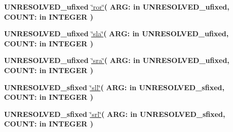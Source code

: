 \begin{DoxyCompactItemize}
\item 
{\bfseries {\bfseries \textcolor{vhdlchar}{U\+N\+R\+E\+S\+O\+L\+V\+E\+D\+\_\+ufixed}\textcolor{vhdlchar}{ }}} \hyperlink{class__fixed__pkg_a9c6bda0792f388964062276c995926d6}{\char`\"{}ror\char`\"{}}{\bfseries  ( }{\bfseries \textcolor{vhdlchar}{A\+R\+G\+: }\textcolor{stringliteral}{in }\textcolor{vhdlchar}{U\+N\+R\+E\+S\+O\+L\+V\+E\+D\+\_\+ufixed}}{\bfseries  , \textcolor{vhdlchar}{C\+O\+U\+N\+T\+: }\textcolor{stringliteral}{in }{\bfseries \textcolor{comment}{I\+N\+T\+E\+G\+E\+R}\textcolor{vhdlchar}{ }}}{\bfseries  )} 
\item 
{\bfseries {\bfseries \textcolor{vhdlchar}{U\+N\+R\+E\+S\+O\+L\+V\+E\+D\+\_\+ufixed}\textcolor{vhdlchar}{ }}} \hyperlink{class__fixed__pkg_a58f9725ae8b23955d8f3982b8bf686bf}{\char`\"{}sla\char`\"{}}{\bfseries  ( }{\bfseries \textcolor{vhdlchar}{A\+R\+G\+: }\textcolor{stringliteral}{in }\textcolor{vhdlchar}{U\+N\+R\+E\+S\+O\+L\+V\+E\+D\+\_\+ufixed}}{\bfseries  , \textcolor{vhdlchar}{C\+O\+U\+N\+T\+: }\textcolor{stringliteral}{in }{\bfseries \textcolor{comment}{I\+N\+T\+E\+G\+E\+R}\textcolor{vhdlchar}{ }}}{\bfseries  )} 
\item 
{\bfseries {\bfseries \textcolor{vhdlchar}{U\+N\+R\+E\+S\+O\+L\+V\+E\+D\+\_\+ufixed}\textcolor{vhdlchar}{ }}} \hyperlink{class__fixed__pkg_a680f13e66a7cabdb18b78049f2041335}{\char`\"{}sra\char`\"{}}{\bfseries  ( }{\bfseries \textcolor{vhdlchar}{A\+R\+G\+: }\textcolor{stringliteral}{in }\textcolor{vhdlchar}{U\+N\+R\+E\+S\+O\+L\+V\+E\+D\+\_\+ufixed}}{\bfseries  , \textcolor{vhdlchar}{C\+O\+U\+N\+T\+: }\textcolor{stringliteral}{in }{\bfseries \textcolor{comment}{I\+N\+T\+E\+G\+E\+R}\textcolor{vhdlchar}{ }}}{\bfseries  )} 
\item 
{\bfseries {\bfseries \textcolor{vhdlchar}{U\+N\+R\+E\+S\+O\+L\+V\+E\+D\+\_\+sfixed}\textcolor{vhdlchar}{ }}} \hyperlink{class__fixed__pkg_a12aadf943c6794fc10b23db44db79889}{\char`\"{}sll\char`\"{}}{\bfseries  ( }{\bfseries \textcolor{vhdlchar}{A\+R\+G\+: }\textcolor{stringliteral}{in }\textcolor{vhdlchar}{U\+N\+R\+E\+S\+O\+L\+V\+E\+D\+\_\+sfixed}}{\bfseries  , \textcolor{vhdlchar}{C\+O\+U\+N\+T\+: }\textcolor{stringliteral}{in }{\bfseries \textcolor{comment}{I\+N\+T\+E\+G\+E\+R}\textcolor{vhdlchar}{ }}}{\bfseries  )} 
\item 
{\bfseries {\bfseries \textcolor{vhdlchar}{U\+N\+R\+E\+S\+O\+L\+V\+E\+D\+\_\+sfixed}\textcolor{vhdlchar}{ }}} \hyperlink{class__fixed__pkg_a42f659825599b007f7db51c81d8093c9}{\char`\"{}srl\char`\"{}}{\bfseries  ( }{\bfseries \textcolor{vhdlchar}{A\+R\+G\+: }\textcolor{stringliteral}{in }\textcolor{vhdlchar}{U\+N\+R\+E\+S\+O\+L\+V\+E\+D\+\_\+sfixed}}{\bfseries  , \textcolor{vhdlchar}{C\+O\+U\+N\+T\+: }\textcolor{stringliteral}{in }{\bfseries \textcolor{comment}{I\+N\+T\+E\+G\+E\+R}\textcolor{vhdlchar}{ }}}{\bfseries  )} 

\end{DoxyCompactItemize}
